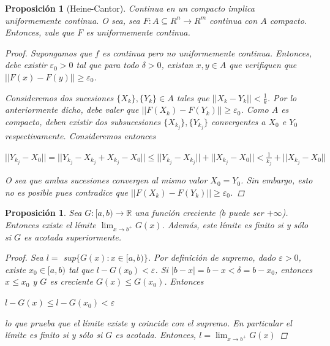 \documentclass[]{article}
\newtheorem{prop}[teo]{Proposición}
\def\R{\mathbb{R}}
\def\e{\varepsilon}
\def\d{\delta}
\begin{document}
\begin{prop}[Heine-Cantor]
	Continua en un compacto implica uniformemente continua. O sea, sea $F:A\subseteq R^n \to R^m$ continua con $A$ compacto. Entonces, vale que $F$ es uniformemente continua.
	\begin{proof}
		Supongamos que $f$ es continua pero no \textit{uniformemente} continua. Entonces, debe existir $\e_0 > 0$ tal que para todo $\d > 0$, existan $x,y \in A$ que verifiquen que $||F(x) - F(y)|| \geq \e_0$.\newline
		
		Consideremos dos sucesiones $\{X_k\}, \{Y_k\} \in A$ tales que $||X_k - Y_k|| < \frac{1}{k}$. Por lo anteriormente dicho, debe valer que $||F(X_k) - F(Y_k)|| \geq \e_0$. Como $A$ es compacto, deben existir dos subsucesiones $\{X_{k_j}\}, \{Y_{k_j}\}$ convergentes a $X_0$ e $Y_0$ respectivamente. Consideremos entonces
		\begin{center} 
			$||Y_{k_j} - X_0|| = ||Y_{k_j} - X_{k_j} + X_{k_j} - X_0|| \leq ||Y_{k_j} - X_{k_j}|| + ||X_{k_j} - X_0|| < \frac{1}{k_j} + ||X_{k_j} - X_0||$
		\end{center}
		O sea que ambas sucesiones convergen al mismo valor $X_0 = Y_0$. Sin embargo, esto no es posible pues contradice que $||F(X_k) - F(Y_k)|| \geq \e_0$.
	\end{proof}
\end{prop}

\begin{prop}
	Sea $G:[a,b)\to\R$ una función creciente ($b$ puede ser $+\infty$). Entonces existe el límite $\displaystyle \lim_{x\to b^+}G(x)$. Además, este límite es finito si y sólo si $G$ es acotada superiormente.
	\begin{proof}
		Sea $l=$ sup$\{G(x):x\in[a,b)\}$. Por definición de supremo, dado $\e>0$, existe $x_0 \in [a,b)$ tal que $l-G(x_0) < \e$. Si $|b-x| = b - x < \delta = b-x_0$, entonces $x\leq x_0$ y $G$ es creciente $G(x) \leq G(x_0)$. Entonces
		\begin{center}
			$l-G(x) \leq l-G(x_0) < \e$
		\end{center}
		lo que prueba que el límite existe y coincide con el supremo. En particular el límite es finito si y sólo si $G$ es acotada.
		Entonces, $\displaystyle l=\lim_{x\to b^+}G(x)$
	\end{proof}
\end{prop}

\newpage
\end{document}
